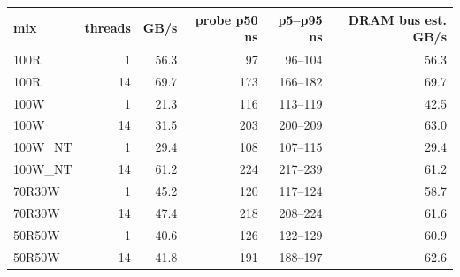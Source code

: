 \begin{tabular}{lrrrrr}
\toprule
mix & threads & GB/s & probe p50 ns & p5--p95 ns & DRAM bus est. GB/s \\
\midrule
100R & 1 & 56.3 & 97 & 96--104 & 56.3 \\
100R & 14 & 69.7 & 173 & 166--182 & 69.7 \\
100W & 1 & 21.3 & 116 & 113--119 & 42.5 \\
100W & 14 & 31.5 & 203 & 200--209 & 63.0 \\
100W\_NT & 1 & 29.4 & 108 & 107--115 & 29.4 \\
100W\_NT & 14 & 61.2 & 224 & 217--239 & 61.2 \\
70R30W & 1 & 45.2 & 120 & 117--124 & 58.7 \\
70R30W & 14 & 47.4 & 218 & 208--224 & 61.6 \\
50R50W & 1 & 40.6 & 126 & 122--129 & 60.9 \\
50R50W & 14 & 41.8 & 191 & 188--197 & 62.6 \\
\bottomrule
\end{tabular}

